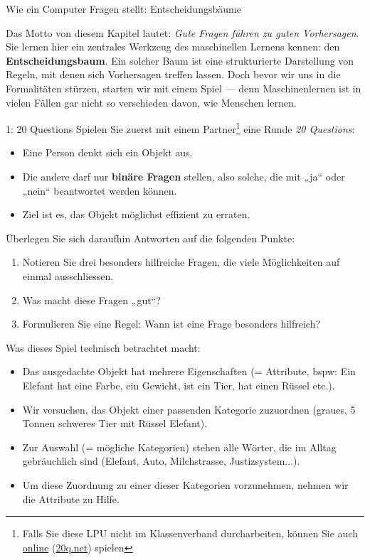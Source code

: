 \begin{lpu}{Wie ein Computer Fragen stellt: Entscheidungsbäume}

Das Motto von diesem Kapitel lautet: \textit{Gute Fragen führen zu guten Vorhersagen}. Sie lernen hier ein zentrales Werkzeug des maschinellen Lernens kennen: den \textbf{Entscheidungsbaum}. Ein solcher Baum ist eine strukturierte Darstellung von Regeln, mit denen sich Vorhersagen treffen lassen. Doch bevor wir uns in die Formalitäten stürzen, starten wir mit einem Spiel — denn Maschinenlernen ist in vielen Fällen gar nicht so verschieden davon, wie Menschen lernen.

\begin{aufgabe}{1: 20 Questions}
Spielen Sie zuerst mit einem Partner\footnote{Falls Sie diese LPU nicht im Klassenverband durcharbeiten, können Sie auch \href{http://www.20q.net/}{online} (\href{http://www.20q.net/}{\url{20q.net}}) spielen} eine Runde \emph{20 Questions}:
\begin{itemize}
  \item Eine Person denkt sich ein Objekt aus.
  \item Die andere darf nur \textbf{binäre Fragen} stellen, also solche, die mit „ja“ oder „nein“ beantwortet werden können.
  \item Ziel ist es, das Objekt möglichst effizient zu erraten.
\end{itemize}

Überlegen Sie sich daraufhin Antworten auf die folgenden Punkte:
\begin{enumerate}
  \item Notieren Sie drei besonders hilfreiche Fragen, die viele Möglichkeiten auf einmal ausschliessen.
  \item Was macht diese Fragen „gut“?
  \item Formulieren Sie eine Regel: Wann ist eine Frage besonders hilfreich?
\end{enumerate}
\end{aufgabe}

Was dieses Spiel technisch betrachtet macht: 
\begin{itemize}
    \item Das ausgedachte Objekt hat mehrere Eigenschaften (= Attribute, bspw: Ein Elefant hat eine Farbe, ein Gewicht, ist ein Tier, hat einen Rüssel etc.).
    \item Wir versuchen, das Objekt einer passenden Kategorie zuzuordnen (graues, 5 Tonnen schweres Tier mit Rüssel \Rightarrow Elefant).
    \item Zur Auswahl (= mögliche Kategorien) stehen alle Wörter, die im Alltag gebräuchlich sind (Elefant, Auto, Milchstrasse, Justizsystem...).
    \item Um diese Zuordnung zu einer dieser Kategorien vorzunehmen, nehmen wir die Attribute zu Hilfe.
\end{itemize}


\end{lpu}
